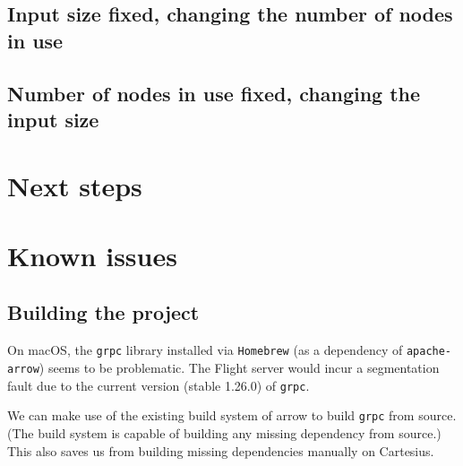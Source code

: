 \documentclass{article}
\begin{document}
\subsection{Input size fixed, changing the number of nodes in use}

\subsection{Number of nodes in use fixed, changing the input size}

\section{Next steps}

\appendix
\section{Known issues}
\subsection{Building the project}

On macOS, the \texttt{grpc} library installed via \texttt{Homebrew} (as a dependency of \texttt{apache-arrow}) seems to be problematic.
The Flight server would incur a segmentation fault due to the current version (stable 1.26.0) of \texttt{grpc}.

We can make use of the existing build system of arrow to build \texttt{grpc} from source.
(The build system is capable of building any missing dependency from source.)
This also saves us from building missing dependencies manually on Cartesius.
\end{document}
